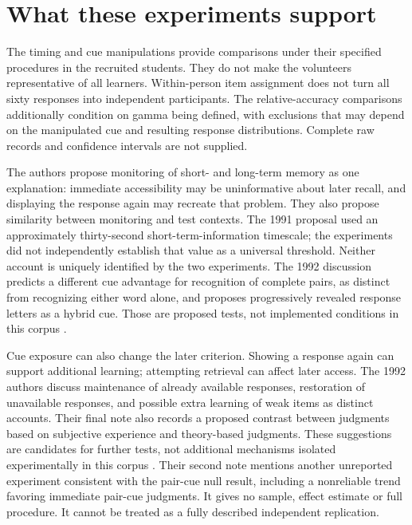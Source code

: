 \section{What these experiments support}
\label{sec:p19-jol-inference}

The timing and cue manipulations provide comparisons under their
specified procedures in the recruited students. They do not make
the volunteers representative of all learners. Within-person
item assignment does not turn all sixty responses into independent
participants. The relative-accuracy comparisons additionally condition
on gamma being defined, with exclusions that may depend on the
manipulated cue and resulting response distributions.
Complete raw records and confidence intervals are not supplied.

The authors propose monitoring of short- and long-term memory as
one explanation: immediate accessibility may be uninformative about
later recall, and displaying the response again may recreate that
problem. They also propose similarity between monitoring and test
contexts. The 1991 proposal used an approximately thirty-second
short-term-information timescale; the experiments did not independently
establish that value as a universal threshold.
Neither account is uniquely identified by the two experiments.
The 1992 discussion predicts a different cue advantage for recognition
of complete pairs, as distinct from recognizing either word alone,
and proposes progressively revealed response letters as a hybrid cue.
Those are proposed tests, not implemented conditions
in this corpus \cite[pp.~379--380]{DunloskyNelson1992CueJOL}.

Cue exposure can also change the later criterion. Showing a response
again can support additional learning; attempting retrieval can affect
later access. The 1992 authors discuss maintenance of already available
responses, restoration of unavailable responses, and possible extra
learning of weak items as distinct accounts.
Their final note also records a proposed contrast between judgments
based on subjective experience and theory-based judgments.
These suggestions are candidates for further tests, not additional
mechanisms isolated experimentally in this corpus
\cite[p.~380, note~6]{DunloskyNelson1992CueJOL}.
Their second note mentions another unreported experiment consistent
with the pair-cue null result, including a nonreliable trend favoring
immediate pair-cue judgments. It gives no sample, effect estimate
or full procedure. It cannot be treated as a fully described
independent replication.

